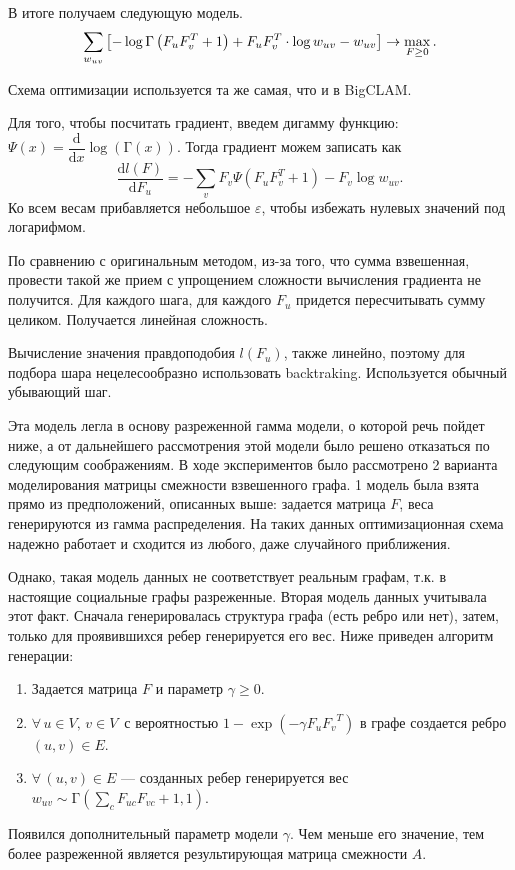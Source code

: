 \documentclass{ITaSconf}
\begin{document}
	В итоге получаем следующую модель.
	$$
	\sum_{w_{uv}}\left[-\log\mathrm{\Gamma}\left( F_u F_v^T + 1 \right) + F_u F_v^T \cdot\log w_{uv} - w_{uv}\right] \rightarrow \max_{F\ge 0}. \\
	$$
	
	Схема оптимизации используется та же самая, что и в BigCLAM.
	
	Для того, чтобы посчитать градиент, введем дигамму функцию: $\Psi(x) = \dfrac{\mathrm{d}}{\mathrm{d}x} \log\left(\mathrm\Gamma(x)\right)$.
	Тогда градиент можем записать как
	$$\dfrac{\mathrm{d}l(F)}{\mathrm{d}F_u} = - \sum_v F_v \Psi\left(F_u F_v^T + 1\right) - F_v \log w_{uv}.$$
	Ко всем весам прибавляется небольшое $\varepsilon$, чтобы избежать нулевых значений под логарифмом.
	
	По сравнению с оригинальным методом, из-за того, что сумма взвешенная, провести такой же прием с упрощением сложности вычисления градиента не получится. 
	Для каждого шага, для каждого $F_u$ придется пересчитывать сумму целиком. 
	Получается линейная сложность. 
	
	Вычисление значения правдоподобия $l(F_u)$, также линейно, поэтому для подбора шара нецелесообразно использовать backtraking. 
	Используется обычный убывающий шаг.
	
	Эта модель легла в основу разреженной гамма модели, о которой речь пойдет ниже, а от дальнейшего рассмотрения этой модели было решено отказаться по следующим соображениям.
	В ходе экспериментов было рассмотрено 2 варианта моделирования матрицы смежности взвешенного графа.
	1 модель была взята прямо из предположений, описанных выше: задается матрица $F$, веса генерируются из гамма распределения.
	На таких данных оптимизационная схема надежно работает и сходится из любого, даже случайного приближения.
	
	Однако, такая модель данных не соответствует реальным графам, т.к. в настоящие социальные графы разреженные. 
	Вторая модель данных учитывала этот факт. 
	Сначала генерировалась структура графа (есть ребро или нет), затем, только для проявившихся ребер генерируется его вес. 
	Ниже приведен алгоритм генерации:
	\begin{enumerate}
		\item Задается матрица $F$ и параметр $\gamma \ge 0 $.
		\item $\forall\, u \in V, \, v \in V \,$ с вероятностью $1 - \exp(-\gamma F_u {F_v}^T)$ в графе создается ребро $(u, v) \in E$.
		\item $\forall\, (u, v) \in E$ --- созданных ребер генерируется вес $w_{uv} \sim \mathrm{\Gamma}\left(\sum_c F_{uc} F_{vc} + 1, 1\right)$.
	\end{enumerate}
	Появился дополнительный параметр модели $\gamma$. 
	Чем меньше его значение, тем более разреженной является результирующая матрица смежности $A$.
	
\end{document}
